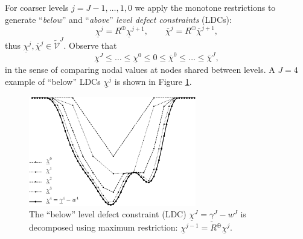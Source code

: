 \documentclass[letterpaper,final,12pt,reqno]{amsart}
\theoremstyle{cstyle}
\theoremstyle{cstyle*}
\theoremstyle{dstyle}
\numberwithin{equation}{section}
\numberwithin{figure}{section}
\numberwithin{table}{section}
\numberwithin{theorem}{section}
\newcommand{\maxR}{R^{\bm{\oplus}}}
\newcommand{\minR}{R^{\bm{\ominus}}}
\begin{document}
For coarser levels $j=J-1,\dots,1,0$ we apply the monotone restrictions to generate ``\emph{below}'' and ``\emph{above}'' \emph{level defect constraints} (LDCs):
\begin{equation}
\underline{\chi}^{j} = \maxR \underline{\chi}^{j+1}, \qquad \overline{\chi}^{j} = \minR \overline{\chi}^{j+1}, \label{eq:fe:chilevels}
\end{equation}
thus $\underline{\chi}^{j},\overline{\chi}^{j} \in \tilde{\mathcal{V}}^J$.  Observe that
\begin{equation}
\underline{\chi}^{J} \le \dots \le \underline{\chi}^0 \le 0 \le \overline{\chi}^0 \le \dots \le \overline{\chi}^J, \label{eq:fe:chiordering}
\end{equation}
in the sense of comparing nodal values at nodes shared between levels.  A $J=4$ example of ``below'' LDCs $\underline{\chi}^j$ is shown in Figure \ref{fig:chiphilevels}.

\begin{figure}
\includegraphics[width=0.65\textwidth]{fixfigs/chiphilevels.pdf}
\caption{The ``below'' level defect constraint (LDC) $\underline{\chi}^J = \underline{\gamma}^J - w^J$ is decomposed using maximum restriction: $\underline{\chi}^{j-1} = \maxR \underline{\chi}^j$.}
\label{fig:chiphilevels}
\end{figure}
\end{document}
